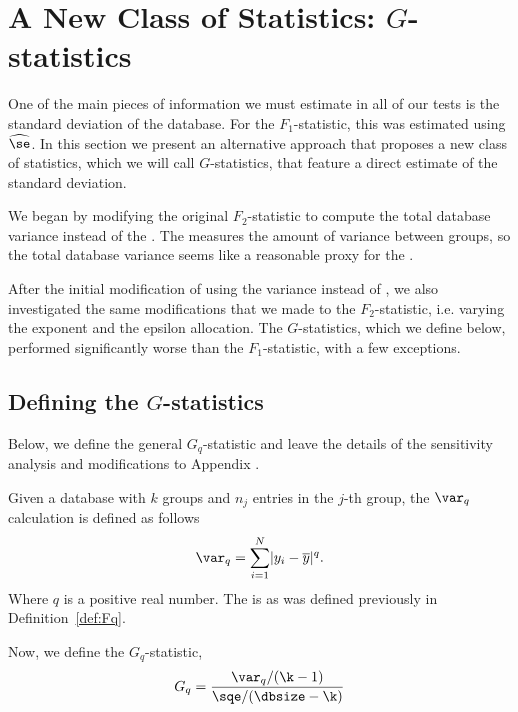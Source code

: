 \section{A New Class of Statistics: $G$-statistics}
One of the main pieces of information we must estimate in all of our tests is the standard deviation of the database. For the $F_1$-statistic, this was estimated using $\widehat{\se}$.  In this section we present an alternative approach that proposes a new class of statistics, which we will call $G$-statistics, that feature a direct estimate of the standard deviation.

We began by modifying the original $F_2$-statistic to compute the total database variance instead of the \ssa. The \ssa measures the amount of variance between groups, so the total database variance seems like a reasonable proxy for the \ssa.

After the initial modification of using the variance instead of \ssa, we also investigated the same modifications that we made to the $F_2$-statistic, i.e. varying the exponent and the epsilon allocation. The $G$-statistics, which we define below, performed significantly worse than the $F_1$-statistic, with a few exceptions. 

  

\subsection{Defining the $G$-statistics}
Below, we define the general $G_q$-statistic and leave the details of the sensitivity analysis and modifications to Appendix .

\begin{definition}[$G_q$-statistic] \label{def:Gq} Given a database \x with $k$ groups and $n_j$ entries in the $j$-th group, the $\var_q$ calculation is defined as follows
\begin{equation*}
\var_q = \sum_{i=1}^N \lvert y_{i} - \overline{y} \rvert^q.
\end{equation*}
Where $q$ is a positive real number. The \sqe is as was defined previously in Definition~\ref{def:Fq}.

Now, we define the $G_q$-statistic,
\begin{equation*}
G_q = \frac{\var_q/(\k-1)}{\sqe/(\dbsize-\k)}
\end{equation*}
\end{definition}


